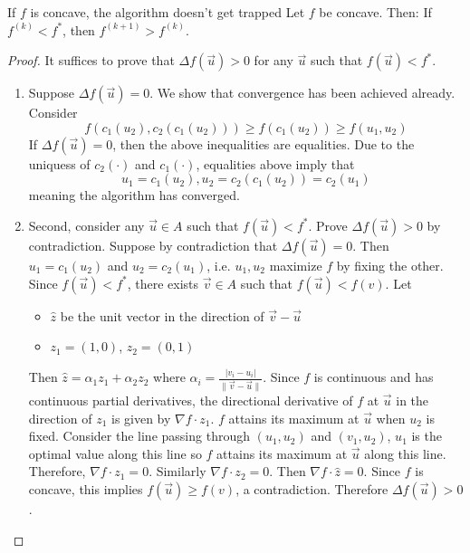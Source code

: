 \documentclass[../main.tex]{subfiles}
\begin{document}
\begin{bbox}{{If $f$ is concave, the algorithm doesn't get trapped}}
    Let $f$ be concave. Then: 
    \newline
    If $f^{(k)} < f^*$, then $f^{(k+1)}>f^{(k)}$.
    \begin{proof}
        It suffices to prove that $\Delta f(\vec u)>0$ for any $\vec u$ such that $f(\vec u) < f^*$.
        \begin{enumerate}
            \item Suppose $\Delta f(\vec u)=0$. We show that convergence has been achieved already. Consider \[
            f(c_1(u_2), c_2(c_1(u_2)))\geq f(c_1(u_2))\geq f(u_1,u_2)
            \]
            If $\Delta f(\vec u)=0$, then the above inequalities are equalities. Due to the uniquess of $c_2(\cdot)$ and $c_1(\cdot)$, equalities above imply that \[
            u_1=c_1(u_2), u_2=c_2(c_1(u_2))=c_2(u_1)
            \] meaning the algorithm has converged.
            \item Second, consider any $\vec u\in A$ such that $f(\vec u) < f^*$. Prove $\Delta f(\vec u)>0$ by contradiction. Suppose by contradiction that $\Delta f(\vec u)=0$. Then $u_1=c_1(u_2)$ and $u_2=c_2(u_1)$, i.e. $u_1,u_2$ maximize $f$ by fixing the other.
            \newline
            Since $f(\vec u)<f^*$, there exists $\vec v\in A$ such that $f(\vec u) < f(v).$ Let
            \begin{itemize}
                \item $\hat z$ be the unit vector in the direction of $\vec v-\vec u$
                \item $z_1=(1,0)$, $z_2=(0,1)$
            \end{itemize}
            Then $\hat z=\alpha_1 z_1 + \alpha_2 z_2$ where $\alpha_i=\frac{|v_i-u_i|}{\|\vec v-\vec u\|}$.
            Since $f$ is continuous and has continuous partial derivatives, the directional derivative of $f$ at $\vec u$ in the direction of $z_1$ is given by $\nabla f\cdot z_1$.
            \newline
            $f$ attains its maximum at $\vec u$ when $u_2$ is fixed. 
            \newline
            Consider the line passing through $(u_1,u_2)$ and $(v_1,u_2)$, $u_1$ is the optimal value along this line so $f$ attains its maximum at $\vec u$ along this line. Therefore, $\nabla f\cdot z_1=0$. Similarly $\nabla f \cdot z_2=0$.
            \newline
            Then $\nabla f\cdot \hat z=0$. 
            \newline
            Since $f$ is concave, this implies $f(\vec u)\geq f(v)$, a contradiction. Therefore $\Delta f(\vec u)>0$.     
        \end{enumerate}
    \end{proof}
\end{bbox}
\end{document}
